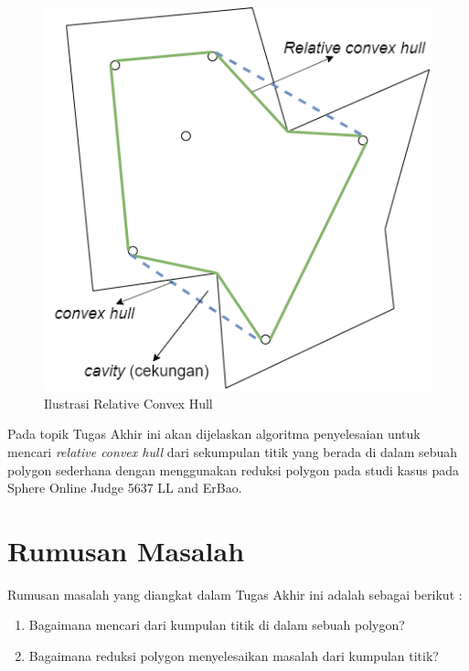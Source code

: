 \begin{figure}[!h]
	\Centering
	\includegraphics [width=0.5\columnwidth]{bab2/img/ilustrasi-relative-convex-hull}
	\caption {Ilustrasi Relative Convex Hull}
	\label {fig:ilustrasi-relative-convex-hull}
\end{figure}

\par Pada topik Tugas Akhir ini akan dijelaskan algoritma penyelesaian untuk mencari \textit{relative convex hull} dari sekumpulan titik yang berada di dalam sebuah polygon sederhana dengan menggunakan reduksi polygon pada studi kasus pada Sphere Online Judge 5637 LL and ErBao.

\section { Rumusan Masalah}

Rumusan masalah yang diangkat dalam Tugas Akhir ini adalah sebagai berikut :

\begin {enumerate}
    \item Bagaimana mencari \RCH dari kumpulan titik di dalam sebuah polygon?
    \item Bagaimana reduksi polygon menyelesaikan masalah \RCH dari kumpulan titik?
\end {enumerate}

